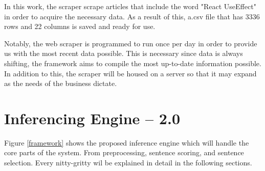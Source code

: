 In this work, the scraper scrape articles that include the word "React UseEffect" in order to acquire the necessary data. As a result of this, a.csv file that has 3336 rows and 22 columns is saved and ready for use.

Notably, the web scraper is programmed to run once per day in order to provide us with the most recent data possible. This is necessary since data is always shifting, the framework aims to compile the most up-to-date information possible. In addition to this, the scraper will be housed on a server so that it may expand as the needs of the business dictate.


\section{Inferencing Engine -- 2.0}
Figure \ref*{framework} shows the proposed inference engine which will handle the core parts of the system. From preprocessing, sentence scoring, and sentence selection. Every nitty-gritty  wil be explained in detail in the following sections.

